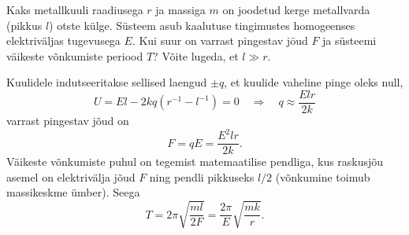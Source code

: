 
Kaks metallkuuli raadiusega $r$ ja massiga $m$ on joodetud kerge metallvarda (pikkus $l$) otste külge. Süsteem asub kaalutuse tingimustes homogeenses elektriväljas tugevusega $E$. Kui suur on varrast pingestav jōud $F$ ja süsteemi väikeste võnkumiste periood $T$? Võite lugeda, et $l \gg r $.

\hint

\solu
Kuulidele indutseeritakse sellised laengud $\pm q$, et kuulide vaheline pinge oleks null,
$$
U=E l-2 k q\left(r^{-1}-l^{-1}\right)=0 \quad \Rightarrow \quad q \approx \frac{E l r}{2 k}
$$
varrast pingestav jõud on
$$
F=q E=\frac{E^{2} l r}{2 k}.
$$
Väikeste võnkumiste puhul on tegemist matemaatilise pendliga, kus raskusjõu asemel on elektrivälja jõud $F$ ning pendli pikkuseks $l / 2$ (võnkumine toimub massikeskme ümber). Seega
$$
T=2 \pi \sqrt{\frac{m l}{2 F}}=\frac{2 \pi}{E} \sqrt{\frac{m k}{r}}.
$$

\probend